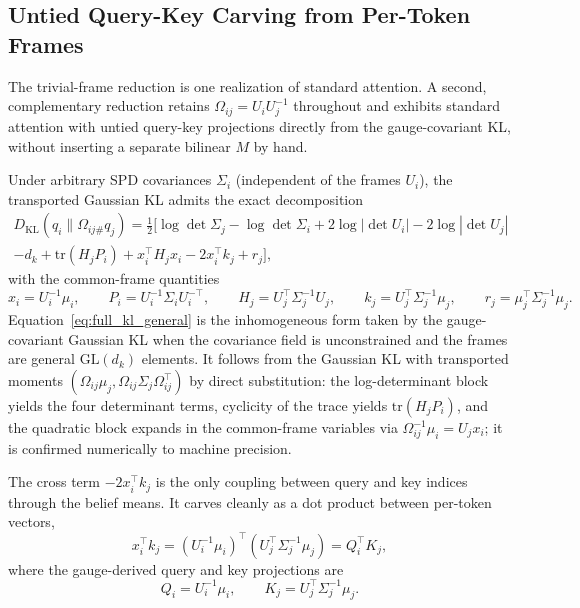 \subsection{Untied Query-Key Carving from Per-Token Frames}
\label{sec:untied_qk}

The trivial-frame reduction is one realization of standard attention. A second, complementary reduction retains $\Omega_{ij} = U_iU_j^{-1}$ throughout and exhibits standard attention with untied query-key projections directly from the gauge-covariant KL, without inserting a separate bilinear $M$ by hand.

Under arbitrary SPD covariances $\Sigma_i$ (independent of the frames $U_i$), the transported Gaussian KL admits the exact decomposition
\begin{multline}
D_{\mathrm{KL}}(q_i \| \Omega_{ij\#}q_j) = \tfrac{1}{2}\Big[\log\det\Sigma_j - \log\det\Sigma_i + 2\log|\det U_i| - 2\log|\det U_j| \\
 - d_k + \mathrm{tr}(H_j P_i) + x_i^\top H_j x_i - 2x_i^\top k_j + r_j\Big],
\label{eq:full_kl_general}
\end{multline}
with the common-frame quantities
\begin{equation}
x_i = U_i^{-1}\mu_i, \qquad P_i = U_i^{-1}\Sigma_i U_i^{-\top}, \qquad H_j = U_j^\top \Sigma_j^{-1} U_j, \qquad k_j = U_j^\top \Sigma_j^{-1}\mu_j, \qquad r_j = \mu_j^\top \Sigma_j^{-1}\mu_j.
\end{equation}
Equation~\eqref{eq:full_kl_general} is the inhomogeneous form taken by the gauge-covariant Gaussian KL when the covariance field is unconstrained and the frames are general $\mathrm{GL}(d_k)$ elements. It follows from the Gaussian KL with transported moments $(\Omega_{ij}\mu_j, \Omega_{ij}\Sigma_j\Omega_{ij}^\top)$ by direct substitution: the log-determinant block yields the four determinant terms, cyclicity of the trace yields $\mathrm{tr}(H_jP_i)$, and the quadratic block expands in the common-frame variables via $\Omega_{ij}^{-1}\mu_i = U_jx_i$; it is confirmed numerically to machine precision.

The cross term $-2x_i^\top k_j$ is the only coupling between query and key indices through the belief means. It carves cleanly as a dot product between per-token vectors,
\begin{equation}
x_i^\top k_j = (U_i^{-1}\mu_i)^\top (U_j^\top \Sigma_j^{-1}\mu_j) = Q_i^\top K_j,
\label{eq:untied_cross_term}
\end{equation}
where the gauge-derived query and key projections are
\begin{equation}
\boxed{Q_i = U_i^{-1}\mu_i, \qquad K_j = U_j^\top \Sigma_j^{-1}\mu_j.}
\label{eq:gauge_qk}
\end{equation}

